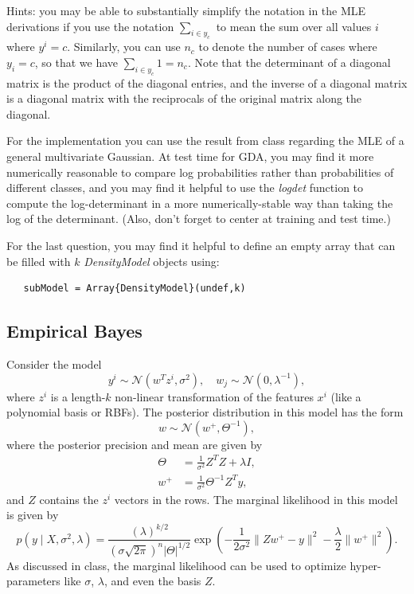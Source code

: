 \documentclass{article}
\def\norm#1{\|#1\|}
\newcommand{\alignStar}[1]{\begin{align*}#1\end{align*}}
\def\cond{\; | \;}
\begin{document}
Hints: you may be able to substantially simplify the notation in the MLE derivations if you use the notation $\sum_{i \in y_c}$ to mean the sum over all values $i$ where $y^i = c$. Similarly, you can use $n_c$ to denote the number of cases where $y_i = c$, so that we have $\sum_{i \in y_c}1 = n_c$. Note that the determinant of a diagonal matrix is the product of the diagonal entries, and the inverse of a diagonal matrix is a diagonal matrix with the reciprocals of the original matrix along the diagonal. 

For the implementation you can use the result from class regarding the MLE of a general multivariate Gaussian. At test time for GDA, you may find it more numerically reasonable to compare log probabilities rather than probabilities of different classes, and you may find it helpful to use the \emph{logdet}  function to compute the log-determinant in a more numerically-stable way than taking the log of the determinant. (Also, don't forget to center at training and test time.)

For the last question, you may find it helpful to define an empty array that can be filled with $k$ \emph{DensityModel} objects  using:
\begin{verbatim}
   subModel = Array{DensityModel}(undef,k)
\end{verbatim}

\pagebreak

\subsection{Empirical Bayes}

 Consider the model
\[
y^i \sim \mathcal{N}(w^Tz^i,\sigma^2), \quad w_j \sim \mathcal{N}(0,\lambda^{-1}),
\]
where $z^i$ is a length-$k$ non-linear transformation of the features $x^i$ (like a polynomial basis or RBFs).
The posterior distribution in this model has the form
\[
w \sim \mathcal{N}(w^+,\Theta^{-1}),
\]
where the posterior precision and mean are given by
\alignStar{
\Theta & = \frac{1}{\sigma^2}Z^TZ + \lambda I,\\
w^+ & = \frac{1}{\sigma^2}\Theta^{-1}Z^Ty,
}
and $Z$ contains the $z^i$ vectors in the rows. The marginal likelihood in this model is given by
\[
p(y \cond X, \sigma^2,\lambda) = \frac{(\lambda)^{k/2}}{(\sigma\sqrt{2\pi})^n|\Theta|^{1/2}} \exp\left(-\frac{1}{2\sigma^2}\norm{Zw^+ - y}^2 - \frac \lambda 2\norm{w^+}^2\right).
\]
As discussed in class, the marginal likelihood can be used to optimize hyper-parameters like $\sigma$, $\lambda$, and even the basis $Z$.
\end{document}
